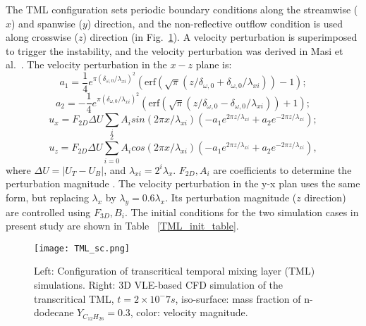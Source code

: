 The TML configuration sets periodic boundary conditions along the streamwise ($x$) and spanwise ($y$) direction, and the non-reflective outflow condition is used along crosswise ($z$) direction (in Fig.~\ref{TML_GEO}). A velocity perturbation is superimposed to trigger the instability, and the velocity perturbation was derived in Masi et al.~\cite{masi2013multi}. The velocity perturbation in the $x-z$ plane is:
$$ a_1 = \frac{1}{4} e^{\pi (\delta_{\omega,0}/ \lambda_{xi})^2}(\textrm{erf}(\sqrt{\pi}(z/\delta_{\omega,0}+ \delta_{\omega,0}/\lambda_{xi}))-1);$$
$$ a_2 = -\frac{1}{4} e^{\pi (\delta_{\omega,0}/ \lambda_{xi})^2}(\textrm{erf}(\sqrt{\pi}(z/\delta_{\omega,0}- \delta_{\omega,0}/\lambda_{xi}))+1);$$
$$u_x = F_{2D} \Delta U \sum_i A_i sin(2\pi x/ \lambda_{xi}) (-a_1 e^{2\pi z / \lambda_{xi}}+a_2 e^{- 2\pi z / \lambda_{xi}});$$
$$u_z= F_{2D} \Delta U \sum_{i=0}^{2} A_i cos(2\pi x/ \lambda_{xi}) (-a_1 e^{2\pi z / \lambda_{xi}}+a_2 e^{- 2\pi z / \lambda_{xi}}),$$
where $\Delta U = |U_T-U_B|$, and $\lambda_{xi}=2^i\lambda_x$. $F_{2D}, A_i$ are coefficients to determine the perturbation magnitude \cite{masi2013multi}. The velocity perturbation in the y-x plan uses the same form, but replacing $\lambda_x$ by $\lambda_y = 0.6 \lambda_x$. Its perturbation magnitude ($z$ direction) are controlled using $F_{3D}, B_i$. The initial conditions for the two simulation cases in present study are shown in Table ~\ref{TML_init_table}.

\begin{figure}[htbp]
\centering

\texttt{[image: TML\_sc.png]}
\hspace{.2in}
\caption{Left: Configuration of transcritical temporal mixing layer (TML) simulations. Right: 3D VLE-based CFD simulation of the transcritical TML, $t=2\times 10^-7s$, iso-surface: mass fraction of n-dodecane $Y_{C_{12}H_{26}} = 0.3$, color: velocity magnitude.}
\label{TML_GEO} 
\end{figure}


